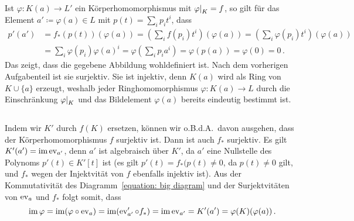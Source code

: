 \subsection{}

Ist $\varphi \colon K(a) \to L'$ ein Körperhomomorphismus mit $\restrict{\varphi}{K} = f$, so gilt für das Element $a' \coloneqq \varphi(a) \in L$ mit $p(t) = \sum_i p_i t^i$, dass
\begin{align*}
      p'(a')
  &=  f_*( p(t) )( \varphi(a) )
   =  \left( \sum_i f(p_i) t^i \right)( \varphi(a) )
   =  \left( \sum_i \varphi(p_i) t^i \right)( \varphi(a) )
  \\
  &=  \sum_i \varphi(p_i) \varphi(a)^i
   =  \varphi\left( \sum_i p_i a^i \right)
   =  \varphi( p(a) )
   =  \varphi(0)
   =   0 \,.
\end{align*}
Das zeigt, dass die gegebene Abbildung wohldefiniert ist.
Nach dem vorherigen Aufgabenteil ist sie surjektiv.
Sie ist injektiv, denn $K(a)$ wird als Ring von $K \cup \{a\}$ erzeugt, weshalb jeder Ringhomomorphismus $\varphi \colon K(a) \to L$ durch die Einschränkung $\restrict{\varphi}{K}$ und das Bildelement $\varphi(a)$ bereits eindeutig bestimmt ist.





\subsection{}

Indem wir $K'$ durch $f(K)$ ersetzen, können wir o.B.d.A.\ davon ausgehen, dass der Körperhomomorphismus $f$ surjektiv ist.
Dann ist auch $f_*$ surjektiv.
Es gilt $K'(a') = \operatorname{im} \operatorname{ev}_{a'}$, denn $a'$ ist algebraisch über $K'$, da $a'$ eine Nullstelle des Polynoms $p'(t) \in K'[t]$ ist (es gilt $p'(t) = f_*(p(t) \neq 0$, da $p(t) \neq 0$ gilt, und $f_*$ wegen der Injektvität von $f$ ebenfalls injektiv ist).
Aus der Kommutativität des Diagramm~\eqref{equation: big diagram} und der Surjektvitäten von $\operatorname{ev}_a$ und $f_*$ folgt somit, dass
\[
    \operatorname{im} \varphi
  = \operatorname{im} (\varphi \circ \operatorname{ev}_a)
  = \operatorname{im} (\operatorname{ev}_{a'}' \circ f_*)
  = \operatorname{im} \operatorname{ev}_{a'}
  = K'(a')
  = \varphi(K)(\varphi(a)) \,.
\]





